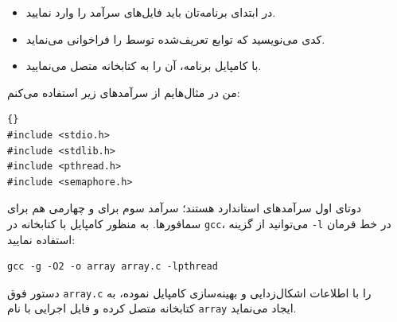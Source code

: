 \documentclass{book}
\begin{document}
\begin{itemize}

\item %
    در ابتدای برنامه‌تان باید فایل‌های سرآمد را وارد نمایید. 

\item %
    کدی می‌نویسید که توابع تعریف‌شده توسط  را فراخوانی می‌نماید. 

\item %
    با کامپایل برنامه، آن را به کتابخانه  متصل می‌نمایید. 

\end{itemize}

    من در مثال‌هایم از سرآمدهای زیر استفاده می‌کنم:

\begin{latin}
\begin{lstlisting}[title=\rl{سرآمدها}]{}
#include <stdio.h>
#include <stdlib.h>
#include <pthread.h>
#include <semaphore.h>
\end{lstlisting}
\end{latin}

    دوتای اول سرآمدهای استاندارد هستند؛ سرآمد سوم برای  و چهارمی هم برای سمافورها. 
    به منظور کامپایل با کتابخانه  در {\tt gcc}، می‌توانید از گزینه {\tt -l} در خط فرمان استفاده نمایید: 

\begin{latin}
\begin{lstlisting}
gcc -g -O2 -o array array.c -lpthread
\end{lstlisting}
\end{latin}

    دستور فوق  {\tt array.c} را با اطلاعات اشکال‌زدایی و بهینه‌سازی کامپایل نموده، به کتابخانه  متصل کرده و 
    فایل اجرایی با نام {\tt array} ایجاد می‌نماید. 
\end{document}
